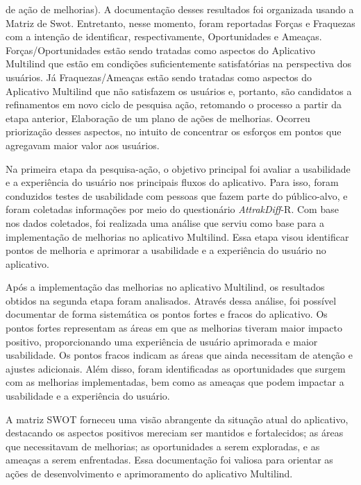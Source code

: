 \begin{itemize}
	de ação de melhorias). A documentação desses resultados foi organizada usando a Matriz de Swot. Entretanto, nesse momento, foram reportadas Forças e Fraquezas com a intenção de identificar, respectivamente, Oportunidades e Ameaças. Forças/Oportunidades estão sendo tratadas como aspectos do Aplicativo Multilind que estão em condições suficientemente satisfatórias na perspectiva dos usuários. Já Fraquezas/Ameaças estão sendo tratadas como aspectos do Aplicativo Multilind que não satisfazem os usuários e, portanto, são candidatos a refinamentos 
	em novo ciclo de pesquisa ação, retomando o processo a partir da etapa anterior, Elaboração de um plano de ações de melhorias. Ocorreu priorização desses aspectos, no intuito de concentrar os esforços em pontos que agregavam maior valor aos usuários.
\end{itemize}

Na primeira etapa da pesquisa-ação, o objetivo principal foi avaliar a usabilidade e a experiência do usuário nos principais fluxos do aplicativo. Para isso, foram conduzidos testes de usabilidade com pessoas que fazem parte do público-alvo, e foram coletadas informações por meio do questionário \textit{AttrakDiff}-R. Com base nos dados coletados, foi realizada uma análise que serviu como base para a implementação de melhorias no aplicativo Multilind. Essa etapa visou identificar pontos de melhoria e aprimorar a usabilidade e a experiência do 
usuário no aplicativo.

Após a implementação das melhorias no aplicativo Multilind, os resultados obtidos na segunda etapa foram analisados. Através dessa análise, foi possível documentar de forma sistemática os pontos fortes e fracos do aplicativo. Os pontos fortes representam as áreas em que as melhorias tiveram maior impacto positivo, proporcionando uma experiência de usuário aprimorada e maior usabilidade. Os pontos fracos indicam as áreas que ainda necessitam de atenção e ajustes adicionais. Além disso, foram identificadas as oportunidades que surgem com as 
melhorias implementadas, bem como as ameaças que podem impactar a usabilidade e a experiência do usuário.

A matriz SWOT forneceu uma visão abrangente da situação atual do aplicativo, destacando os aspectos positivos mereciam ser mantidos e fortalecidos; as áreas que necessitavam de melhorias; as oportunidades a serem exploradas, e as ameaças a serem enfrentadas. Essa documentação foi valiosa para orientar as ações de desenvolvimento e aprimoramento do aplicativo Multilind.

